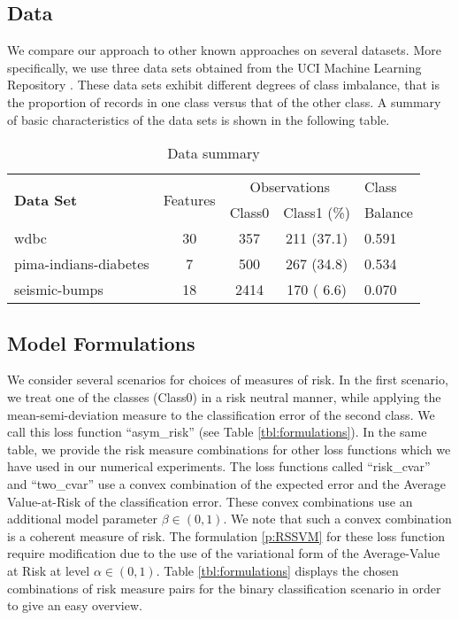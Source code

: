 \documentclass[10pt,letterpaper]{article}
\newcommand{\1}{1{\hskip -2.55 pt}\hbox{I}}
\begin{document}
\subsection{Data} %
\label{sub:data}


We compare our approach to other known approaches on several datasets. 
More specifically, we use three data sets obtained from the UCI Machine Learning Repository \cite{Lichman:2013}. 
These data sets exhibit different degrees of class imbalance, that is the proportion of records in one class versus that of the other class. 
A summary of basic characteristics of the data sets is shown in the following table.


\begin{table}[h!]
\centering
\begin{tabular}{lcccl}
  \hline
  \multirow{2}{*}{\textbf{Data Set}}& \multirow{2}{*}{Features}& \multicolumn{2}{c}{Observations} & Class \\
   &  & Class0 & Class1 (\%)                & Balance\\
  \hline
  wdbc     & 30 &  357 & 211 (37.1)  & 0.591 \\
  pima-indians-diabetes &  7 &  500 & 267 (34.8)  & 0.534 \\
  seismic-bumps  & 18 & 2414 & 170 ( 6.6)  & 0.070 \\
  \hline
\end{tabular}
\caption{Data summary}
\label{tbl:data_summary}
\end{table}




\subsection{Model Formulations} %
\label{sub:model_formulations}

We consider several scenarios for choices of measures of risk.  
In the first scenario, we treat one of the classes (Class0) in a risk neutral manner, while applying the mean-semi-deviation measure to the classification error of the second class. 
We call this loss function ``asym\_risk'' (see Table \ref{tbl:formulations}). 
In the same table, we provide the risk measure combinations for other loss functions which we have used in our numerical experiments.
The loss functions called ``risk\_cvar'' and ``two\_cvar'' use a convex combination of the expected error and the Average Value-at-Risk of the classification error.
These convex combinations use an additional model parameter $\beta \in (0,1)$. 
We note that such a convex combination is a coherent measure of risk.
The formulation \eqref{p:RSSVM} for these loss function require modification due to the use of the variational form of the Average-Value at Risk at level $\alpha\in (0,1)$.
Table \ref{tbl:formulations} displays the chosen combinations of risk measure pairs for the binary classification scenario in order to give an easy overview. 
\end{document}
